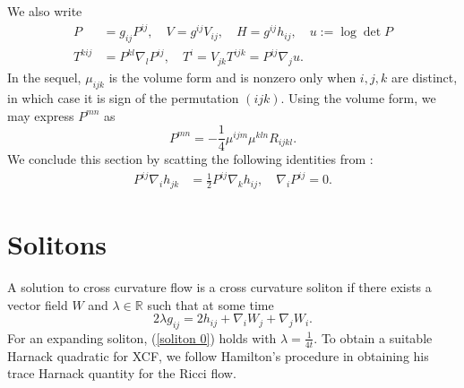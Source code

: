 \documentclass{amsart}
\theoremstyle{definition}
\theoremstyle{remark}
\numberwithin{equation}{section}
\begin{document}
We also write
\begin{align}
P&=g_{ij}P^{ij},\quad V=g^{ij}V_{ij},\quad H=g^{ij}h_{ij},\quad u:=\log\det P\\
T^{kij}&=P^{kl}\nabla_l P^{ij},\quad T^i=V_{jk}T^{ijk}=P^{ij}\nabla_ju.
\end{align}
In the sequel, $\mu_{ijk}$ is the volume form and is nonzero only when $i,j,k$ are distinct, in which case it is sign of the permutation $(ijk)$. Using the volume form, we may express $P^{mn}$ as
\begin{equation}
P^{mn}=-\frac{1}{4}\mu^{ijm}\mu^{kln}R_{ijkl}.
\end{equation}
We conclude this section by scatting the following identities from \cite[Lemma 1]{Chowcross2002}:
\begin{align}\label{equ: important}
P^{ij}\nabla_ih_{jk}&=\frac{1}{2}P^{ij}\nabla_kh_{ij},\quad
\nabla_iP^{ij}=0.
\end{align}
\section{Solitons}
A solution to cross curvature flow is a cross curvature soliton if there exists a vector field $W$ and $\lambda\in \mathbb{R}$ such that at some time
\begin{equation}\label{soliton 0}
2\lambda g_{ij}=2h_{ij}+\nabla_iW_j+\nabla_jW_i.
\end{equation}
For an expanding soliton, (\ref{soliton 0}) holds with $\lambda=\frac{1}{4t}.$
To obtain a suitable Harnack quadratic for XCF, we follow Hamilton's procedure in obtaining his trace Harnack quantity for the Ricci flow.
\end{document}
